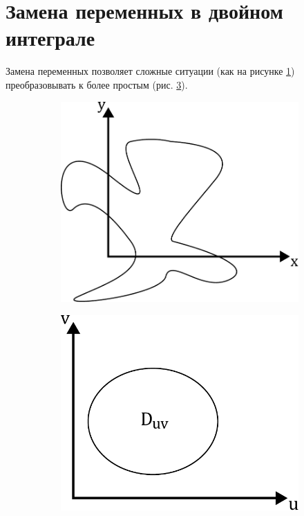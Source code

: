 \documentclass[a4paper, 14pt]{report}
\theoremstyle{definition}
\begin{document}
	\section{Замена переменных в двойном интеграле}
		Замена переменных позволяет сложные ситуации (как на рисунке \ref{fig:unreal_hardcore_d}) преобразовывать к более простым (рис. \ref{fig:easy_af_d}).
		\begin{figure}[!ht]
			\begin{subfigure}{0.4\linewidth}
				\centering
				\includegraphics[width=1\linewidth]{hardcore_d}
				\caption{}
				\label{fig:unreal_hardcore_d}
			\end{subfigure}
			\hfill
			\begin{subfigure}{0.4\linewidth}
				\centering
				\includegraphics[width=1\linewidth]{easy_af_d}
				\caption{}
				\label{fig:easy_af_d}
			\end{subfigure}
			\caption{}
		\end{figure}
	
\end{document}
